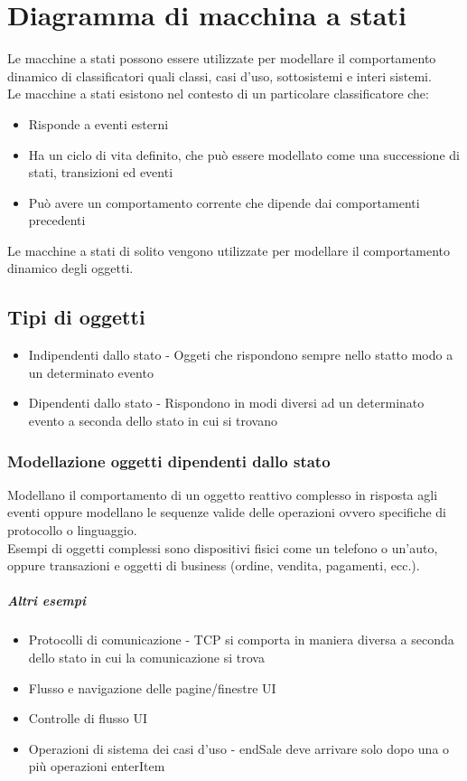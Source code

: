\chapter{Diagramma di macchina a stati}
Le macchine a stati possono essere utilizzate per modellare il comportamento dinamico di classificatori
quali classi, casi d'uso, sottosistemi e interi sistemi.
\\ Le macchine a stati esistono nel contesto di un particolare classificatore che:
\begin{itemize}
    \item Risponde a eventi esterni
    \item Ha un ciclo di vita definito, che può essere modellato come una successione di stati,
    transizioni ed eventi
    \item Può avere un comportamento corrente che dipende dai comportamenti precedenti
\end{itemize}
Le macchine a stati di solito vengono utilizzate per modellare il comportamento
dinamico degli oggetti.
\section{Tipi di oggetti}
\begin{itemize}
    \item Indipendenti dallo stato - Oggeti che rispondono sempre nello statto modo a un determinato evento
    \item Dipendenti dallo stato - Rispondono in modi diversi ad un determinato evento a seconda dello stato
    in cui si trovano
\end{itemize}
\subsection*{Modellazione oggetti dipendenti dallo stato}
Modellano il comportamento di un oggetto reattivo complesso in risposta agli eventi oppure modellano
le sequenze valide delle operazioni ovvero specifiche di protocollo o linguaggio.
\\ Esempi di oggetti complessi sono dispositivi fisici come un telefono o un'auto, oppure
transazioni e oggetti di business (ordine, vendita, pagamenti, ecc.).
\paragraph*{Altri esempi}
\begin{itemize}
    \item Protocolli di comunicazione - TCP si comporta in maniera diversa a seconda dello stato in cui 
    la comunicazione si trova
    \item Flusso e navigazione delle pagine/finestre UI
    \item Controlle di flusso UI
    \item Operazioni di sistema dei casi d'uso - endSale deve arrivare solo dopo una o più operazioni enterItem
\end{itemize}

